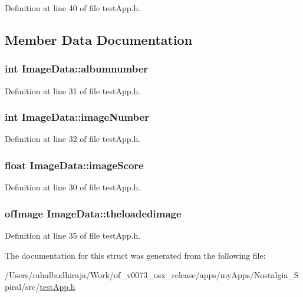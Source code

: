 Definition at line 40 of file test\-App.\-h.



\subsection{Member Data Documentation}
\hypertarget{struct_image_data_a372655668350953b85fda1f07cd3ffe1}{
\subsubsection[{albumnumber}]{\setlength{\rightskip}{0pt plus 5cm}int Image\-Data\-::albumnumber}}\label{struct_image_data_a372655668350953b85fda1f07cd3ffe1}


Definition at line 31 of file test\-App.\-h.

\hypertarget{struct_image_data_a254eb9353be246c69591d51088683397}{
\subsubsection[{image\-Number}]{\setlength{\rightskip}{0pt plus 5cm}int Image\-Data\-::image\-Number}}\label{struct_image_data_a254eb9353be246c69591d51088683397}


Definition at line 32 of file test\-App.\-h.

\hypertarget{struct_image_data_a7161728d2f1bd4240bd9359f6276dd3b}{
\subsubsection[{image\-Score}]{\setlength{\rightskip}{0pt plus 5cm}float Image\-Data\-::image\-Score}}\label{struct_image_data_a7161728d2f1bd4240bd9359f6276dd3b}


Definition at line 30 of file test\-App.\-h.

\hypertarget{struct_image_data_acf1bde00dd79a0960269618d9b885f61}{
\subsubsection[{theloadedimage}]{\setlength{\rightskip}{0pt plus 5cm}of\-Image Image\-Data\-::theloadedimage}}\label{struct_image_data_acf1bde00dd79a0960269618d9b885f61}


Definition at line 35 of file test\-App.\-h.



The documentation for this struct was generated from the following file\-:\begin{DoxyCompactItemize}
\item 
/\-Users/rahulbudhiraja/\-Work/of\-\_\-v0073\-\_\-osx\-\_\-release/apps/my\-Apps/\-Nostalgia\-\_\-\-Spiral/src/\hyperlink{test_app_8h}{test\-App.\-h}\end{DoxyCompactItemize}

